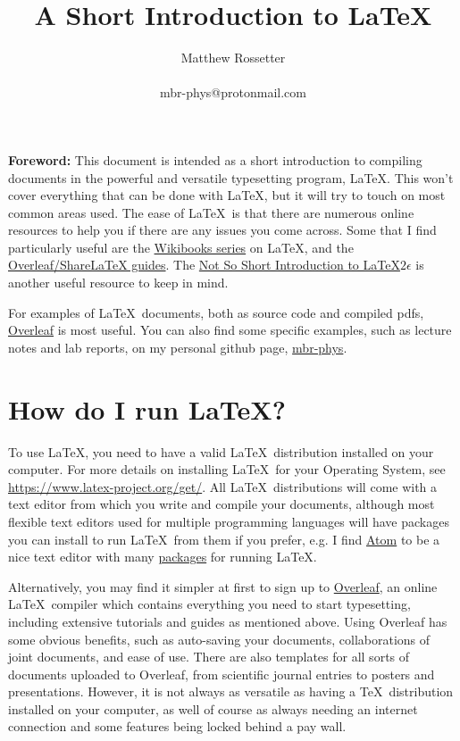 \documentclass[a4paper]{article}
\title{A Short Introduction to \LaTeX}
\author{Matthew Rossetter \\ \\ mbr-phys@protonmail.com}
\date{}
\begin{document}
\maketitle

\textbf{Foreword:} This document is intended as a short introduction to compiling documents in the powerful and versatile typesetting program, \LaTeX. 
This won't cover everything that can be done with \LaTeX, but it will try to touch on most common areas used. 
The ease of \LaTeX\, is that there are numerous online resources to help you if there are any issues you come across. 
Some that I find particularly useful are the \href{https://en.wikibooks.org/wiki/LaTeX}{Wikibooks series} on \LaTeX, and the \href{https://www.overleaf.com/learn}{Overleaf/ShareLaTeX guides}.
The \href{https://tobi.oetiker.ch/lshort/lshort.pdf}{Not So Short Introduction to \LaTeX $2\epsilon$} is another useful resource to keep in mind. 

For examples of \LaTeX\, documents, both as source code and compiled pdfs, \href{https://www.overleaf.com/}{Overleaf} is most useful. 
You can also find some specific examples, such as lecture notes and lab reports, on my personal github page, \href{https://github.com/mbr-phys}{mbr-phys}.

\section{How do I run \LaTeX?}
To use \LaTeX, you need to have a valid \LaTeX\, distribution installed on your computer. 
For more details on installing \LaTeX\, for your Operating System, see \href{https://www.latex-project.org/get/}{https://www.latex-project.org/get/}.
All \LaTeX\, distributions will come with a text editor from which you write and compile your documents, although most flexible text editors used for multiple programming languages will have packages you can install to run \LaTeX\, from them if you prefer, e.g. I find \href{atom.io}{Atom} to be a nice text editor with many \href{https://atom.io/packages/search?q=latex}{packages} for running \LaTeX.

Alternatively, you may find it simpler at first to sign up to \href{https://www.overleaf.com/}{Overleaf}, an online \LaTeX\, compiler which contains everything you need to start typesetting, including extensive tutorials and guides as mentioned above. 
Using Overleaf has some obvious benefits, such as auto-saving your documents, collaborations of joint documents, and ease of use. 
There are also templates for all sorts of documents uploaded to Overleaf, from scientific journal entries to posters and presentations.
However, it is not always as versatile as having a \TeX\, distribution installed on your computer, as well of course as always needing an internet connection and some features being locked behind a pay wall. 
\end{document}
